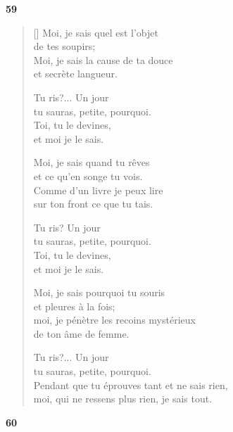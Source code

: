 \documentclass[a4paper,12pt]{book}
\begin{document}
\bigskip

\begin{center}
  \textbf{59}
\end{center}

\settowidth{\versewidth}{pendant que tu éprouves tant et ne sais rien,}

\begin{verse}[\versewidth]
  Moi, je sais quel est l'objet \\
  de tes soupirs; \\
  Moi, je sais la cause de ta douce \\
  et secrète langueur.

  Tu ris?... Un jour \\
  tu sauras, petite, pourquoi. \\
  Toi, tu le devines, \\
  et moi je le sais.

  Moi, je sais quand tu rêves \\
  et ce qu'en songe tu vois. \\
  Comme d'un livre je peux lire \\
  sur ton front ce que tu tais.

  Tu ris? Un jour \\
  tu sauras, petite, pourquoi. \\
  Toi, tu le devines, \\
  et moi je le sais.

  Moi, je sais pourquoi tu souris \\
  et pleures à la fois; \\
  moi, je pénètre les recoins mystérieux \\
  de ton âme de femme.

  Tu ris?... Un jour \\
  tu sauras, petite, pourquoi. \\
  Pendant que tu éprouves tant et ne sais rien, \\
  moi, qui ne ressens plus rien, je sais tout.
\end{verse}

\bigskip

\begin{center}
  \textbf{60}
\end{center}

\settowidth{\versewidth}{fleur que je touche s'effeuille.}
\end{document}
